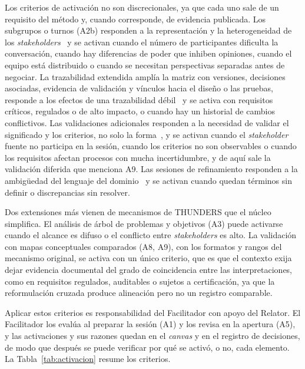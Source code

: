 \documentclass[12pt,letterpaper,oneside]{report}
\begin{document}
Los criterios de activación no son discrecionales, ya que cada uno sale de un
requisito del método y, cuando corresponde, de evidencia publicada. Los
subgrupos o turnos (A2b) responden a la representación y la heterogeneidad de
los \textit{stakeholders}~\cite{khan2022stakeholders} y se activan cuando el
número de participantes dificulta la conversación, cuando hay diferencias de
poder que inhiben opiniones, cuando el equipo está distribuido o cuando se
necesitan perspectivas separadas antes de negociar. La trazabilidad extendida amplía
la matriz con versiones, decisiones asociadas, evidencia de validación y
vínculos hacia el diseño o las pruebas, responde a los efectos de una
trazabilidad débil~\cite{fucci2022traceability} y se activa con requisitos
críticos, regulados o de alto impacto, o cuando hay un historial de cambios
conflictivos. Las validaciones adicionales responden a la necesidad de validar
el significado y los criterios, no solo la
forma~\cite{iso29148,fuller2021blurring}, y se activan cuando el
\textit{stakeholder} fuente no participa en la sesión, cuando los criterios no
son observables o cuando los requisitos afectan procesos con mucha
incertidumbre, y de aquí sale la validación diferida que menciona A9. Las sesiones
de refinamiento responden a la ambigüedad del lenguaje del
dominio~\cite{ribeiro2020} y se activan cuando quedan términos sin definir o
discrepancias sin resolver.

Dos extensiones más vienen de mecanismos de THUNDERS que el núcleo simplifica.
El análisis de árbol de problemas y objetivos (A3) puede activarse cuando el
alcance es difuso o el conflicto entre \textit{stakeholders} es alto. La
validación con mapas conceptuales comparados (A8, A9), con los formatos y rangos
del mecanismo original, se activa con un único criterio, que es que el contexto
exija dejar evidencia documental del grado de coincidencia entre las
interpretaciones, como en requisitos regulados, auditables o sujetos a
certificación, ya que la reformulación cruzada produce alineación pero no un
registro comparable.

Aplicar estos criterios es responsabilidad del Facilitador con apoyo del
Relator. El Facilitador los evalúa al preparar la sesión (A1) y los revisa en la
apertura (A5), y las activaciones y sus razones quedan en el \textit{canvas} y
en el registro de decisiones, de modo que después se puede verificar por qué se
activó, o no, cada elemento. La Tabla~\ref{tab:activacion} resume los criterios.
\end{document}
